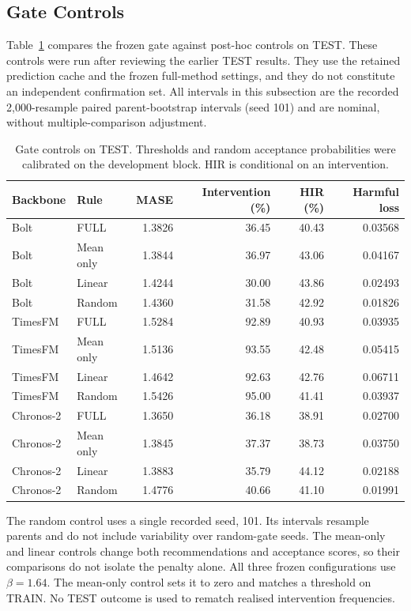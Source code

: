 \documentclass{article}
\begin{document}
\subsection{Gate Controls}
\label{app:gate-controls}
Table~\ref{tab:v52-gates} compares the frozen gate against post-hoc controls on TEST.
These controls were run after reviewing the earlier TEST results. They use the retained
prediction cache and the frozen full-method settings, and they do not constitute an
independent confirmation set. All intervals in this subsection are the recorded
2,000-resample paired parent-bootstrap intervals (seed 101) and are nominal, without
multiple-comparison adjustment.

\begin{table}[htbp]
\centering\small
\caption{Gate controls on TEST. Thresholds and random acceptance probabilities were
calibrated on the development block. HIR is conditional on an intervention.}
\label{tab:v52-gates}
\begin{tabular*}{\textwidth}{@{\extracolsep{\fill}}llrrrr@{}}
\toprule
Backbone & Rule & MASE & Intervention (\%) & HIR (\%) & Harmful loss \\
\midrule
Bolt & FULL & 1.3826 & 36.45 & 40.43 & 0.03568 \\
Bolt & Mean only & 1.3844 & 36.97 & 43.06 & 0.04167 \\
Bolt & Linear & 1.4244 & 30.00 & 43.86 & 0.02493 \\
Bolt & Random & 1.4360 & 31.58 & 42.92 & 0.01826 \\
TimesFM & FULL & 1.5284 & 92.89 & 40.93 & 0.03935 \\
TimesFM & Mean only & 1.5136 & 93.55 & 42.48 & 0.05415 \\
TimesFM & Linear & 1.4642 & 92.63 & 42.76 & 0.06711 \\
TimesFM & Random & 1.5426 & 95.00 & 41.41 & 0.03937 \\
Chronos-2 & FULL & 1.3650 & 36.18 & 38.91 & 0.02700 \\
Chronos-2 & Mean only & 1.3845 & 37.37 & 38.73 & 0.03750 \\
Chronos-2 & Linear & 1.3883 & 35.79 & 44.12 & 0.02188 \\
Chronos-2 & Random & 1.4776 & 40.66 & 41.10 & 0.01991 \\
\bottomrule
\end{tabular*}
\end{table}

The random control uses a single recorded seed, 101. Its intervals resample parents and
do not include variability over random-gate seeds. The mean-only and linear controls change
both recommendations and acceptance scores, so their comparisons do not isolate the penalty
alone. All three frozen configurations use $\beta=1.64$. The mean-only control sets it to
zero and matches a threshold on TRAIN. No TEST outcome is used to rematch realised intervention
frequencies.
\end{document}
